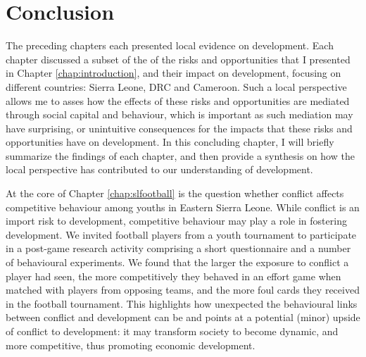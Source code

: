 \chapter{Conclusion}
\label{chap:conclusion}
The preceding chapters each presented local evidence on development. Each chapter discussed a subset of the of the risks and opportunities that I presented in Chapter \ref{chap:introduction}, and their impact on development, focusing on different countries: Sierra Leone, DRC and Cameroon. Such a local perspective allows me to asses how the effects of these risks and opportunities are mediated through social capital and behaviour, which is important as such mediation may have surprising, or unintuitive consequences for the impacts that these risks and opportunities have on development. In this concluding chapter, I will briefly summarize the findings of each chapter, and then provide a synthesis on how the local perspective has contributed to our understanding of development.

At the core of Chapter \ref{chap:slfootball} is the question whether conflict affects competitive behaviour among youths in Eastern Sierra Leone. While conflict is an import risk to development, competitive behaviour may play a role in fostering development. We invited football players from a youth tournament to participate in a post-game research activity comprising a short questionnaire and a number of behavioural experiments. We found that the larger the exposure to conflict a player had seen, the more competitively they behaved in an effort game when matched with players from opposing teams, and the more foul cards they received in the football tournament. This highlights how unexpected the behavioural links between conflict and development can be and points at a potential (minor) upside of conflict to development: it may transform society to become dynamic, and more competitive, thus promoting economic development.

